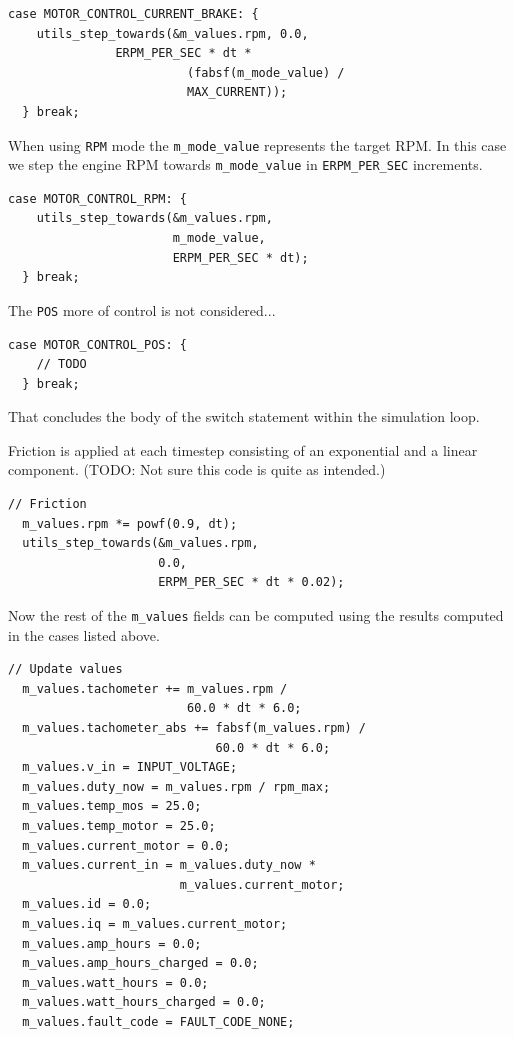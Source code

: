 \documentclass[12pt]{article} %
\begin{document}
{\begin{Verbatim}[samepage=true,frame=single,label=Embedded/RC\_Controller/motor\_sim.c]
  case MOTOR_CONTROL_CURRENT_BRAKE: {
    utils_step_towards(&m_values.rpm, 0.0,
		       ERPM_PER_SEC * dt *
                         (fabsf(m_mode_value) /
                         MAX_CURRENT));
  } break;
\end{Verbatim}

When using \verb!RPM! mode the \verb!m_mode_value! represents the target RPM. In this case we step the engine RPM towards \verb!m_mode_value! in \verb!ERPM_PER_SEC! increments. 

\begin{Verbatim}[samepage=true,frame=single,label=Embedded/RC\_Controller/motor\_sim.c]
  case MOTOR_CONTROL_RPM: {
    utils_step_towards(&m_values.rpm,
                       m_mode_value,
                       ERPM_PER_SEC * dt);
  } break;
\end{Verbatim}

The \verb!POS! more of control is not considered... 

\begin{Verbatim}[samepage=true,frame=single,label=Embedded/RC\_Controller/motor\_sim.c]
  case MOTOR_CONTROL_POS: {
    // TODO
  } break;
\end{Verbatim}

That concludes the body of the switch statement within the simulation loop. 


Friction is applied at each timestep consisting of an exponential and a linear component. (TODO: Not sure this code is quite as intended.)
\begin{Verbatim}[samepage=true,frame=single,label=Embedded/RC\_Controller/motor\_sim.c]
  // Friction
  m_values.rpm *= powf(0.9, dt);
  utils_step_towards(&m_values.rpm,
                     0.0,
                     ERPM_PER_SEC * dt * 0.02);
\end{Verbatim}


Now the rest of the \verb!m_values! fields can be computed using the
results computed in the cases listed above.

\begin{Verbatim}[samepage=true,frame=single,label=Embedded/RC\_Controller/motor\_sim.c]
  // Update values
  m_values.tachometer += m_values.rpm /
                         60.0 * dt * 6.0;
  m_values.tachometer_abs += fabsf(m_values.rpm) /
                             60.0 * dt * 6.0;
  m_values.v_in = INPUT_VOLTAGE;
  m_values.duty_now = m_values.rpm / rpm_max;
  m_values.temp_mos = 25.0;
  m_values.temp_motor = 25.0;
  m_values.current_motor = 0.0;
  m_values.current_in = m_values.duty_now *
                        m_values.current_motor;
  m_values.id = 0.0;
  m_values.iq = m_values.current_motor;
  m_values.amp_hours = 0.0;
  m_values.amp_hours_charged = 0.0;
  m_values.watt_hours = 0.0;
  m_values.watt_hours_charged = 0.0;
  m_values.fault_code = FAULT_CODE_NONE;
\end{Verbatim}

}
\end{document}
